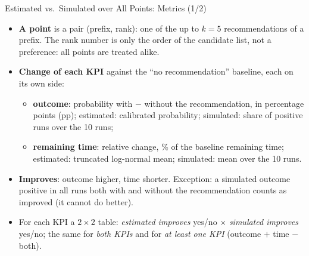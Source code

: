 \documentclass[aspectratio=169]{beamer} %
\begin{document}
\begin{frame}{Estimated vs.\ Simulated over All Points: Metrics (1/2)}
  \footnotesize
  \begin{itemize}
    \item \textbf{A point} is a pair (prefix, rank): one of the up to $k = 5$ recommendations of a prefix.
      The rank number is only the order of the candidate list, not a preference: all points are treated alike.
    \item \textbf{Change of each KPI} against the ``no recommendation'' baseline, each on its own side:
      \begin{itemize}\footnotesize
        \item \textbf{outcome}: probability with $-$ without the recommendation, in percentage points (pp);
          estimated: calibrated probability; simulated: share of positive runs over the 10 runs;
        \item \textbf{remaining time}: relative change, \% of the baseline remaining time; estimated: truncated
          log-normal mean; simulated: mean over the 10 runs.
      \end{itemize}
    \item \textbf{Improves}: outcome higher, time shorter. Exception: a simulated outcome positive in all runs both
      with and without the recommendation counts as improved (it cannot do better).
    \item For each KPI a $2\times2$ table: \emph{estimated improves} yes/no $\times$ \emph{simulated improves} yes/no;
      the same for \emph{both KPIs} and for \emph{at least one KPI} (outcome $+$ time $-$ both).
  \end{itemize}
\end{frame}
\end{document}
